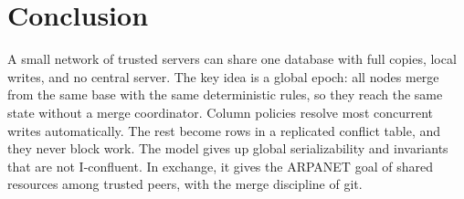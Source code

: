 \documentclass[journal]{IEEEtran}
\begin{document}
\section{Conclusion}
A small network of trusted servers can share one database with full copies, local writes, and no central server. The key idea is a global epoch: all nodes merge from the same base with the same deterministic rules, so they reach the same state without a merge coordinator. Column policies resolve most concurrent writes automatically. The rest become rows in a replicated conflict table, and they never block work. The model gives up global serializability and invariants that are not I-confluent. In exchange, it gives the ARPANET goal of shared resources among trusted peers, with the merge discipline of git.



\end{document}

